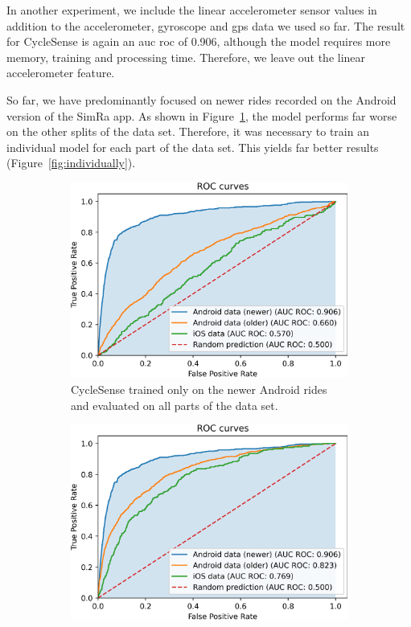 In another experiment, we include the linear accelerometer sensor values in addition to the accelerometer, gyroscope and \ac{gps} data we used so far.
The result for CycleSense is again an \ac{auc} \ac{roc} of 0.906, although the model requires more memory, training and processing time.
Therefore, we leave out the linear accelerometer feature.

So far, we have predominantly focused on newer rides recorded on the Android version of the SimRa app.
As shown in Figure~\ref{fig:traindonone}, the model performs far worse on the other splits of the data set.
Therefore, it was necessary to train an individual model for each part of the data set. 
This yields far better results (Figure~\ref{fig:individually}).

\begin{figure}[t]
	\centering
	\begin{subfigure}[b]{0.475\textwidth}
		\centering
		\includegraphics[width=\textwidth]{fig/rocauctrainedon73.png}
		\caption{\small CycleSense trained only on the newer Android rides and evaluated on all parts of the data set.}
		\label{fig:traindonone}
	\end{subfigure}
	\hfill
	\begin{subfigure}[b]{0.475\textwidth}
		\centering
		\includegraphics[width=\textwidth]{fig/rocauctrainedindividually.png}

\end{subfigure}
\end{figure}

